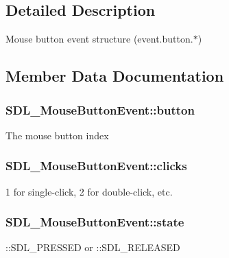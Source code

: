 \subsection{Detailed Description}
Mouse button event structure (event.\+button.$\ast$) 

\subsection{Member Data Documentation}
\hypertarget{struct_s_d_l___mouse_button_event_a1a4680e19ae06d02d2093f0bcba1b24c}{}
\subsubsection[{button}]{ S\+D\+L\+\_\+\+Mouse\+Button\+Event\+::button}\label{struct_s_d_l___mouse_button_event_a1a4680e19ae06d02d2093f0bcba1b24c}
The mouse button index \hypertarget{struct_s_d_l___mouse_button_event_aa606bebcbc3ffc7e932016039c2a36a1}{}
\subsubsection[{clicks}]{ S\+D\+L\+\_\+\+Mouse\+Button\+Event\+::clicks}\label{struct_s_d_l___mouse_button_event_aa606bebcbc3ffc7e932016039c2a36a1}
1 for single-\/click, 2 for double-\/click, etc. \hypertarget{struct_s_d_l___mouse_button_event_a8809cef85cfffad4f2059f2ba4fc6a3d}{}
\subsubsection[{state}]{ S\+D\+L\+\_\+\+Mouse\+Button\+Event\+::state}\label{struct_s_d_l___mouse_button_event_a8809cef85cfffad4f2059f2ba4fc6a3d}
\+::\+S\+D\+L\+\_\+\+P\+R\+E\+S\+S\+E\+D or \+::\+S\+D\+L\+\_\+\+R\+E\+L\+E\+A\+S\+E\+D \hypertarget{struct_s_d_l___mouse_button_event_af64cb09ea68b8081ecc8ee498552e3d7}{}
